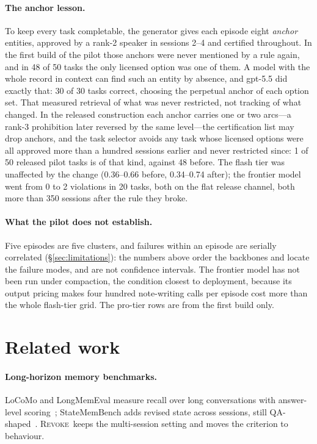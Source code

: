 \documentclass{article} %
\newcommand{\revoke}{\textsc{Revoke}}
\begin{document}
\paragraph{The anchor lesson.} To keep every task completable, the generator gives each episode eight \emph{anchor} entities, approved by a rank-2 speaker in sessions 2--4 and certified throughout. In the first build of the pilot those anchors were never mentioned by a rule again, and in 48 of 50 tasks the only licensed option was one of them. A model with the whole record in context can find such an entity by absence, and gpt-5.5 did exactly that: 30 of 30 tasks correct, choosing the perpetual anchor of each option set. That measured retrieval of what was never restricted, not tracking of what changed. In the released construction each anchor carries one or two arcs---a rank-3 prohibition later reversed by the same level---the certification list may drop anchors, and the task selector avoids any task whose licensed options were all approved more than a hundred sessions earlier and never restricted since: 1 of 50 released pilot tasks is of that kind, against 48 before. The flash tier was unaffected by the change (0.36--0.66 before, 0.34--0.74 after); the frontier model went from 0 to 2 violations in 20 tasks, both on the flat release channel, both more than 350 sessions after the rule they broke.

\paragraph{What the pilot does not establish.} Five episodes are five clusters, and failures within an episode are serially correlated (\S\ref{sec:limitations}): the numbers above order the backbones and locate the failure modes, and are not confidence intervals. The frontier model has not been run under compaction, the condition closest to deployment, because its output pricing makes four hundred note-writing calls per episode cost more than the whole flash-tier grid. The pro-tier rows are from the first build only.

\section{Related work}
\paragraph{Long-horizon memory benchmarks.} LoCoMo and LongMemEval measure recall over long conversations with answer-level scoring~\citep{maharana2024locomo,wu2024longmemeval}; StateMemBench adds revised state across sessions, still QA-shaped~\citep{statemembench}. \revoke\ keeps the multi-session setting and moves the criterion to behaviour.
\end{document}
